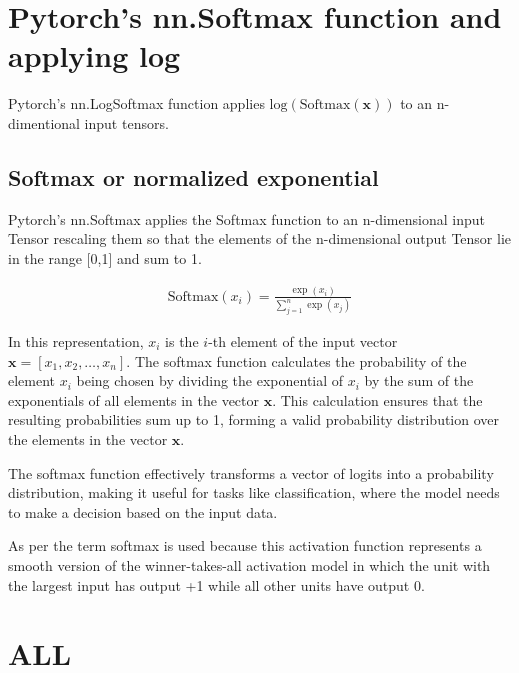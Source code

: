 \section{Pytorch's nn.Softmax function and applying log }

Pytorch's nn.LogSoftmax function applies $\text{log}\left(\text{Softmax}(\mathbf{x})\right)$ to an n-dimentional input tensors. \\



\subsection{Softmax or normalized exponential \parencite{Book-Bishop-Neural}} \label{sec:softmax}

Pytorch's nn.Softmax applies the Softmax function to an n-dimensional input Tensor rescaling them so that the elements of the n-dimensional output Tensor lie in the range [0,1] and sum to 1.




\begin{align}
    \text{Softmax}(x_i) = \frac{{\exp(x_i)}}{{\sum_{j=1}^n \exp(x_j)}} \label{eq:softmax}
\end{align}


In this representation, \(x_i\) is the \(i\)-th element of the input vector \(\mathbf{x} = [x_1, x_2, \ldots, x_n]\). The softmax function calculates the probability of the element \(x_i\) being chosen by dividing the exponential of \(x_i\) by the sum of the exponentials of all elements in the vector \(\mathbf{x}\). This calculation ensures that the resulting probabilities sum up to 1, forming a valid probability distribution over the elements in the vector \(\mathbf{x}\).

The softmax function effectively transforms a vector of logits into a probability distribution, making it useful for tasks like classification, where the model needs to make a decision based on the input data.

As per \parencite{Book-Bishop-Neural} the term softmax is used because this activation function represents a smooth version of the winner-takes-all activation model in which the unit with the largest input has output +1 while all other units have output 0.

\clearpage



\section{\acf{ALL}}

